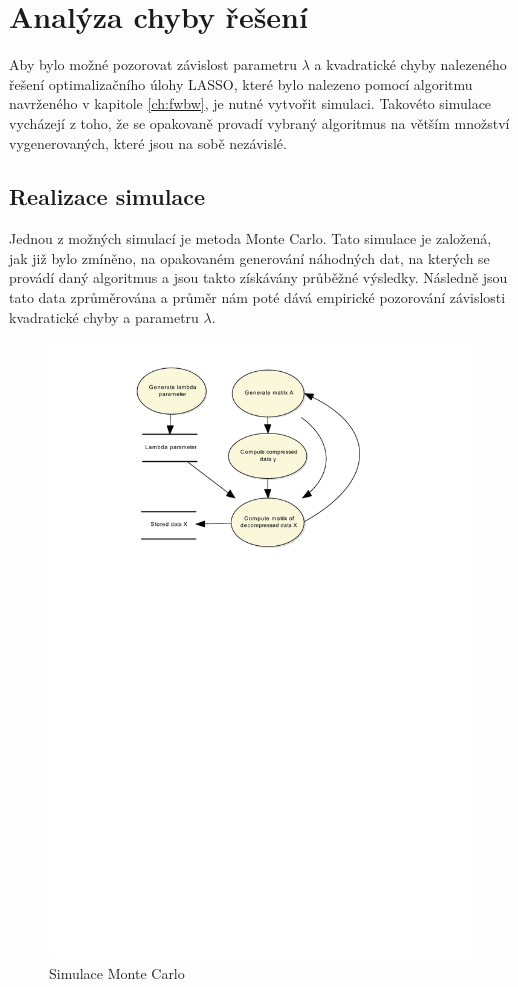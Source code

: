 \documentclass[FM,BP]{tulthesis}
\begin{document}
\chapter{Analýza chyby řešení}
\label{ch:simulace}
Aby bylo možné pozorovat závislost parametru $\lambda$ a kvadratické chyby nalezeného řešení optimalizačního úlohy LASSO, které bylo nalezeno pomocí algoritmu navrženého v kapitole \ref{ch:fwbw}, je nutné vytvořit simulaci. Takovéto simulace vycházejí z toho, že se opakovaně provadí vybraný algoritmus na větším množství vygenerovaných, které jsou na sobě nezávislé.
\section{Realizace simulace}
Jednou z možných simulací je metoda Monte Carlo. Tato simulace je založená, jak již bylo zmíněno, na opakovaném generování náhodných dat, na kterých se provádí daný algoritmus a jsou takto získávány průběžné výsledky. Následně jsou tato data zprůměrována a průměr nám poté dává empirické pozorování závislosti kvadratické chyby a parametru $\lambda$. 

\begin{figure}[!ht]
	\begin{center}
		\includegraphics[scale=0.65]{obr/mcsim.pdf}
	\end{center}
	\caption{Simulace Monte Carlo}
	\label{fig:mcSim}
\end{figure}
\end{document}
